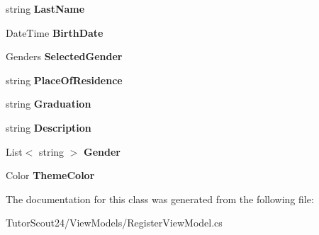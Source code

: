 \begin{DoxyCompactItemize}
\mbox{\label{class_tutor_scout24_1_1_view_models_1_1_register_view_model_ae832573f3c15629ad92b3f0291e0fdab}} 
string {\bfseries Last\+Name}
\item 
\mbox{\label{class_tutor_scout24_1_1_view_models_1_1_register_view_model_a5dd842a629b3a375f6edac1a687205ac}} 
Date\+Time {\bfseries Birth\+Date}
\item 
\mbox{\label{class_tutor_scout24_1_1_view_models_1_1_register_view_model_aa05545b86cf7bf89c3579e7feb01694f}} 
Genders {\bfseries Selected\+Gender}
\item 
\mbox{\label{class_tutor_scout24_1_1_view_models_1_1_register_view_model_a4e5ac1b24f6960b8f78953fb0752a5f2}} 
string {\bfseries Place\+Of\+Residence}
\item 
\mbox{\label{class_tutor_scout24_1_1_view_models_1_1_register_view_model_a3bcb7f78f8c9c4d0f681d21977ff948b}} 
string {\bfseries Graduation}
\item 
\mbox{\label{class_tutor_scout24_1_1_view_models_1_1_register_view_model_a3a8792b2c10b113f2652955bfa49b56a}} 
string {\bfseries Description}
\item 
\mbox{\label{class_tutor_scout24_1_1_view_models_1_1_register_view_model_a5a1f0ccb63552581a04545d0e5bd0fe4}} 
List$<$ string $>$ {\bfseries Gender}
\item 
\mbox{\label{class_tutor_scout24_1_1_view_models_1_1_register_view_model_a0772dacbe053745ff7e6c196471d9bba}} 
Color {\bfseries Theme\+Color}
\end{DoxyCompactItemize}


The documentation for this class was generated from the following file\+:\begin{DoxyCompactItemize}
\item 
Tutor\+Scout24/\+View\+Models/Register\+View\+Model.\+cs\end{DoxyCompactItemize}

